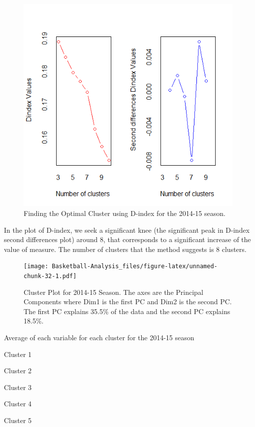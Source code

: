 \documentclass[]{book}
\begin{document}
\begin{figure}
\centering
\includegraphics{images/Dindex.png}
\caption{Finding the Optimal Cluster using D-index for the 2014-15 season.}
\end{figure}

In the plot of D-index, we seek a significant knee (the significant peak in D-index second differences plot) around 8, that corresponds to a significant increase of the value of measure.
The number of clusters that the method suggests is 8 clusters.

\begin{figure}
\centering
\texttt{[image: Basketball-Analysis\_files/figure-latex/unnamed-chunk-32-1.pdf]}
\caption{\label{fig:unnamed-chunk-32}Cluster Plot for 2014-15 Season. The axes are the Principal Components where Dim1 is the first PC and Dim2 is the second PC. The first PC explains 35.5\% of the data and the second PC explains 18.5\%.}
\end{figure}

\label{tab:unnamed-chunk-33}Average of each variable for each cluster for the 2014-15 season

Cluster 1

Cluster 2

Cluster 3

Cluster 4

Cluster 5
\end{document}
